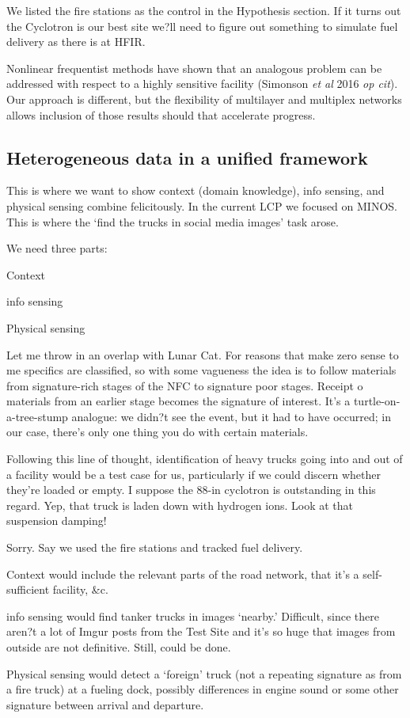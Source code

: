 \documentclass{article} %
\begin{document}
We listed the fire stations as the control in the Hypothesis section. If it turns out the Cyclotron is our best site we?ll need to figure out something to simulate fuel delivery as there is at HFIR. 

Nonlinear frequentist methods have shown that an analogous problem can be addressed with respect to a highly sensitive facility (Simonson \textit{et al} 2016 \textit{op cit}). Our approach is different, but the flexibility of multilayer and multiplex networks allows inclusion of those results should that accelerate progress.

\subsection{Heterogeneous data in a unified framework}
This is where we want to show context (domain knowledge), info sensing, and physical sensing combine felicitously. In the current LCP we focused on MINOS. This is where the `find the trucks in social media images' task arose. 

We need three parts:
\begin{enumerate*}
\item Context 
\item info sensing
\item Physical sensing
\end{enumerate*}

Let me throw in an overlap with Lunar Cat. For reasons that make zero sense to me specifics are classified, so with some vagueness the idea is to follow materials from signature-rich stages of the NFC to signature poor stages. Receipt o materials from an earlier stage becomes the signature of interest. It's a turtle-on-a-tree-stump analogue: we didn?t see the event, but it had to have occurred; in our case, there's only one thing you do with certain materials. 

Following this line of thought, identification of heavy trucks going into and out of a facility would be a test case for us, particularly if we could discern whether they're loaded or empty. I suppose the 88-in cyclotron is outstanding in this regard. Yep, that truck is laden down with hydrogen ions. Look at that suspension damping!

Sorry. Say we used the fire stations and tracked fuel delivery.
\begin{enumerate*}
\item Context would include the relevant parts of the road network, that it's a self-sufficient facility, \&c.
\item info sensing would find tanker trucks in images `nearby.' Difficult, since there aren?t a lot of Imgur posts from the Test Site and it's so huge that images from outside are not definitive. Still, could be done.
\item Physical sensing would detect a `foreign' truck (not a repeating signature as from a fire truck) at a fueling dock, possibly differences in engine sound or some other signature between arrival and departure.
\end{enumerate*}
\end{document}
